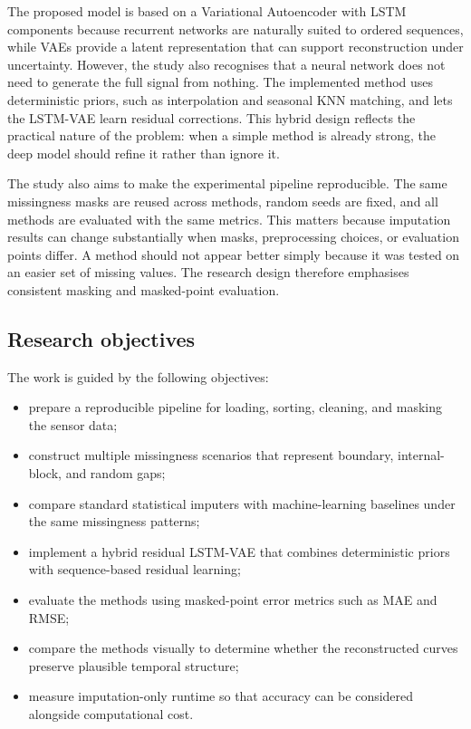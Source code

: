 The proposed model is based on a Variational Autoencoder with LSTM components because recurrent networks are naturally suited to ordered sequences, while VAEs provide a latent representation that can support reconstruction under uncertainty. However, the study also recognises that a neural network does not need to generate the full signal from nothing. The implemented method uses deterministic priors, such as interpolation and seasonal KNN matching, and lets the LSTM-VAE learn residual corrections. This hybrid design reflects the practical nature of the problem: when a simple method is already strong, the deep model should refine it rather than ignore it.

The study also aims to make the experimental pipeline reproducible. The same missingness masks are reused across methods, random seeds are fixed, and all methods are evaluated with the same metrics. This matters because imputation results can change substantially when masks, preprocessing choices, or evaluation points differ. A method should not appear better simply because it was tested on an easier set of missing values. The research design therefore emphasises consistent masking and masked-point evaluation.

\subsection{Research objectives}
The work is guided by the following objectives:

\begin{itemize}
	\item prepare a reproducible pipeline for loading, sorting, cleaning, and masking the sensor data;
	\item construct multiple missingness scenarios that represent boundary, internal-block, and random gaps;
	\item compare standard statistical imputers with machine-learning baselines under the same missingness patterns;
	\item implement a hybrid residual LSTM-VAE that combines deterministic priors with sequence-based residual learning;
	\item evaluate the methods using masked-point error metrics such as MAE and RMSE;
	\item compare the methods visually to determine whether the reconstructed curves preserve plausible temporal structure;
	\item measure imputation-only runtime so that accuracy can be considered alongside computational cost.
\end{itemize}


